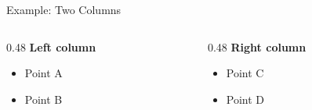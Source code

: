 \documentclass[aspectratio=169]{beamer}
\begin{document}
\begin{frame}{Example: Two Columns}
    \begin{columns}[T]
        \begin{column}{0.48\textwidth}
            \textbf{Left column}
            \begin{itemize}
                \item Point A
                \item Point B
            \end{itemize}
        \end{column}
        \begin{column}{0.48\textwidth}
            \textbf{Right column}
            \begin{itemize}
                \item Point C
                \item Point D
            \end{itemize}
        \end{column}
    \end{columns}
\end{frame}
\end{document}
